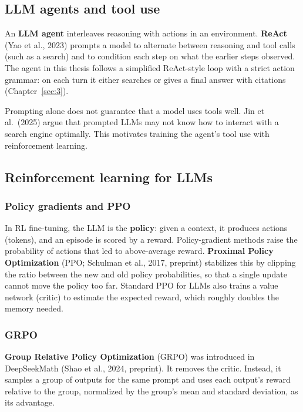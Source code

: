 \subsection{LLM agents and tool use}\label{sec:2.4}

An \textbf{LLM agent} interleaves reasoning with actions in an
environment. \textbf{ReAct} (Yao et al., 2023) prompts a model to
alternate between reasoning and tool calls (such as a search) and to
condition each step on what the earlier steps observed. The agent in
this thesis follows a simplified ReAct-style loop with a strict action
grammar: on each turn it either searches or gives a final answer with
citations (Chapter~\ref{sec:3}).

Prompting alone does not guarantee that a model uses tools well. Jin et
al.~(2025) argue that prompted LLMs may not know how to interact with a
search engine optimally. This motivates training the agent's tool use
with reinforcement learning.

\subsection{Reinforcement learning for LLMs}\label{sec:2.5}

\subsubsection{Policy gradients and PPO}\label{sec:2.5.1}

In RL fine-tuning, the LLM is the \textbf{policy}: given a context, it
produces actions (tokens), and an episode is scored by a reward.
Policy-gradient methods raise the probability of actions that led to
above-average reward. \textbf{Proximal Policy Optimization} (PPO;
Schulman et al., 2017, preprint) stabilizes this by clipping the ratio
between the new and old policy probabilities, so that a single update
cannot move the policy too far. Standard PPO for LLMs also trains a
value network (critic) to estimate the expected reward, which roughly
doubles the memory needed.

\subsubsection{GRPO}\label{sec:2.5.2}

\textbf{Group Relative Policy Optimization} (GRPO) was introduced in
DeepSeekMath (Shao et al., 2024, preprint). It removes the critic.
Instead, it samples a group of outputs for the same prompt and uses each
output's reward relative to the group, normalized by the group's mean
and standard deviation, as its advantage.

